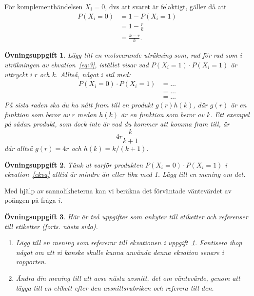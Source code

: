 \documentclass[12pt,a4wide]{article}
\theoremstyle{uppgiftsstil}
\newcommand{\ovningstext}{Övningsuppgift}
\newtheorem{ovning}{\ovningstext}
\newenvironment{uppgift}{\begin{framed}\begin{ovning}}%
                        {\end{ovning}\end{framed}}
\theoremstyle{avklaradstil}
\begin{document}
För komplementhändelsen $X_i=0$, dvs att svaret är felaktigt, gäller
då att 
\begin{equation}    %
  \label{eq:3}      %
  \begin{aligned}    
    P(X_i=0) &= 1-P(X_i=1)  \\
             &= 1-\frac{r}{k}  \\
             &= \frac{k - r}{k}.
  \end{aligned}
\end{equation}
\begin{uppgift} \label{uppgiftA}
  Lägg till en motsvarande uträkning som, rad för rad som i
  uträkningen av ekvation~\ref{eq:3}, istället visar vad $P(X_i=1)
  \cdot P(X_i=1)$ är uttryckt i $r$ och $k$. Alltså, något i stil med:
  \begin{equation}   
    \label{ekva}
    \begin{aligned}    
      P(X_i=0) \cdot P(X_i=1) &= \ldots \\ 
                              &= \ldots \\
                              &= \ldots 
    \end{aligned}
  \end{equation}
  På sista raden ska du ha nått fram till en produkt $g(r)h(k)$, där
  $g(r)$ är en funktion som beror av $r$ medan $h(k)$ är en funktion
  som beror av $k$. Ett exempel på sådan produkt, som dock \emph{inte}
  är vad du kommer att komma fram till, är 
  \begin{displaymath}
    4r\frac{k}{k+1}
  \end{displaymath}
  där alltså $g(r)=4r$ och $h(k)=k/(k+1)$. 
\end{uppgift}
\begin{uppgift}
  Tänk ut varför produkten $ P(X_i=0) \cdot P(X_i=1) $ i
  ekvation~\ref{ekva} alltid är mindre än eller lika med 1. Lägg till
  en mening om det.  
\end{uppgift}
Med hjälp av sannolikheterna kan vi beräkna det förväntade
väntevärdet av poängen på fråga $i$. 
\begin{uppgift}
  Här är två uppgifter som ankyter till etiketter och referenser till
  etiketter (forts. nästa sida). 
  \begin{enumerate}
    \item Lägg till en mening som refererar till ekvationen i
      uppgift~\ref{uppgiftA}. Fantisera ihop något om att vi
      \emph{kanske} skulle kunna använda denna ekvation senare i
      rapporten. 
    \item Ändra din mening till att avse nästa avsnitt, det om
      väntevärde, genom att lägga till en etikett efter den
      avsnittsrubriken och referera till den.  
  \end{enumerate}
\end{uppgift}
\end{document}
